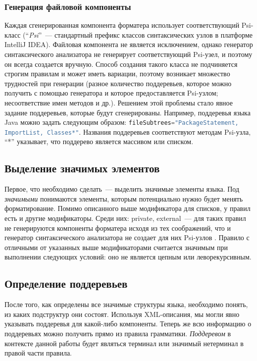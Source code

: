 \documentclass[conference]{IEEEtran}
\begin{document}
\subsubsection*{Генерация файловой компоненты}
Каждая сгенерированная компонента форматера использует соответствующий Psi-класс (``\emph{Psi}''~--- стандартный префикс классов синтаксических узлов в платформе IntelliJ IDEA).
Файловая компонента не является исключением, однако генератор синтаксического анализатора не генерирует соответствующий Psi-узел, и поэтому он всегда создается вручную.
Способ создания такого класса не подчиняется строгим правилам и может иметь вариации, поэтому возникает множество трудностей при генерации (разное количество поддеревьев, которое можно получить с помощью генератора и которое предоставляется Psi-узлом; несоответствие имен методов и др.).
Решением этой проблемы стало явное задание поддеревьев, которые будут сгенерированы.
Например, поддеревья языка Java можно задать следующим образом: \lstinline[language=java]{fileSubtrees="PackageStatement, ImportList, Classes*"}.
Названия поддеревьев соответствуют методам Psi-узла, ``*'' указывает, что поддерево является массивом или списком.


\subsection{Выделение значимых элементов}
Первое, что необходимо сделать~--- выделить значимые элементы языка. 
Под \emph{значимыми} понимаются элементы, которым потенциально нужно будет менять форматирование.
Помимо описанного выше модификатора для списков, у правил есть и другие модификаторы.
Среди них: private, external~--- для таких правил не генерируются компоненты форматера исходя из тех соображений, что и генератор синтаксического анализатора не создает для них Psi-узлов .
Правило с отличными от указанных выше модификаторами считается значимым при выполнении следующих условий: оно не является цепным или леворекурсивным.

\subsection{Определение поддеревьев}
После того, как определены все значимые структуры языка, необходимо понять, из каких подструктур они состоят.
Используя XML-описания, мы могли явно указывать поддеревья для какой-либо компоненты.
Теперь же всю информацию о поддеревьях можно получить прямо из правила грамматики.
\emph{Поддеревом} в контексте данной работы будет являться терминал или значимый нетерминал в правой части правила.
\end{document}
